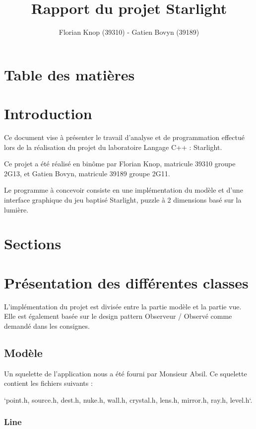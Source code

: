 \documentclass[]{article}
\title{Rapport du projet Starlight}
\author{Florian Knop (39310) - Gatien Bovyn (39189)}
\begin{document}
\maketitle

\tableofcontents

\section{Table des matières}

\section{Introduction}


Ce document vise à présenter le travail d’analyse et de programmation effectué
lors de la réalisation du projet du laboratoire Langage C++ : Starlight.

Ce projet a été réalisé en binôme par Florian Knop, matricule 39310 groupe 2G13,
et Gatien Bovyn, matricule 39189 groupe 2G11.

Le programme à concevoir consiste en une implémentation du modèle et d’une interface
graphique du jeu baptisé Starlight, puzzle à 2 dimensions basé sur la lumière.


\section{Sections}

\section{Présentation des différentes classes}


L’implémentation du projet est divisée entre la partie modèle et la partie vue.
Elle est également basée sur le design pattern  Observeur / Observé  comme demandé
dans les consignes.

\subsection{Modèle}


Un squelette de l’application nous a été fourni par Monsieur Absil. Ce squelette contient les fichiers suivants :

`point.h, source.h, dest.h, nuke.h, wall.h, crystal.h, lens.h, mirror.h, ray.h, level.h`.

\subsubsection{Line}
\end{document}
